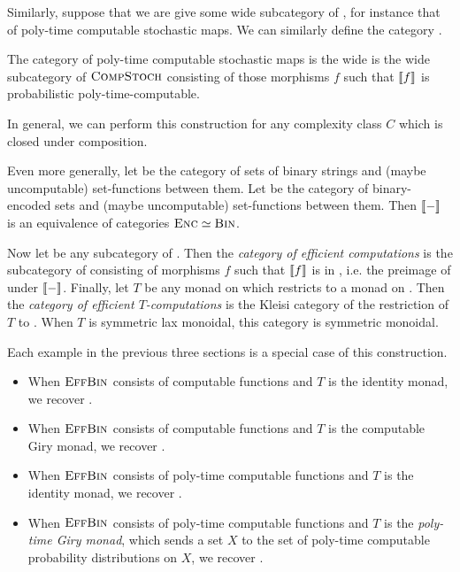 Similarly, suppose that we are give some wide subcategory of
, for instance that of poly-time computable stochastic maps.
We can similarly define the category .

\begin{dfn}
  The category  of poly-time computable stochastic maps is the wide is
  the wide subcategory of ${\textsc{\text{CompStoch}}}$ consisting of those morphisms $f$
  such that $\llbracket f \rrbracket$ is probabilistic poly-time-computable.
\end{dfn}

In general, we can perform this construction for any complexity class $C$ which
is closed under composition.

Even more generally, let  be the category of sets of binary strings and
(maybe uncomputable) set-functions between them. Let  be the category
of binary-encoded sets and (maybe uncomputable) set-functions between them. Then
$\llbracket - \rrbracket$ is an equivalence of categories ${\textsc{\text{Enc}}}\simeq {\textsc{\text{Bin}}}$.

Now let  be any subcategory of . Then the \emph{category
of efficient computations}  is the subcategory of 
consisting of morphisms $f$ such that $\llbracket f \rrbracket$ is in , i.e. the
preimage of  under $\llbracket - \rrbracket$. Finally, let $T$ be any monad on
 which restricts to a monad on . Then the \emph{category of
efficient $T$-computations} is the Kleisi category of the restriction of $T$ to
. When $T$ is symmetric lax monoidal, this category is symmetric
monoidal.

\begin{ex}
  Each example in the previous three sections is a special case of this
  construction.
  \begin{itemize}
    \item When ${\textsc{\text{EffBin}}}$ consists of computable functions and $T$ is the identity
      monad, we recover .
    \item When ${\textsc{\text{EffBin}}}$ consists of computable functions and $T$ is the
      computable Giry monad, we recover .
    \item When ${\textsc{\text{EffBin}}}$ consists of poly-time computable functions and $T$
      is the identity monad, we recover .
    \item When ${\textsc{\text{EffBin}}}$ consists of poly-time computable functions and $T$
      is the \emph{poly-time Giry monad}, which sends a set $X$ to the set of
      poly-time computable probability distributions on $X$, we recover
      .
  \end{itemize}
\end{ex}

